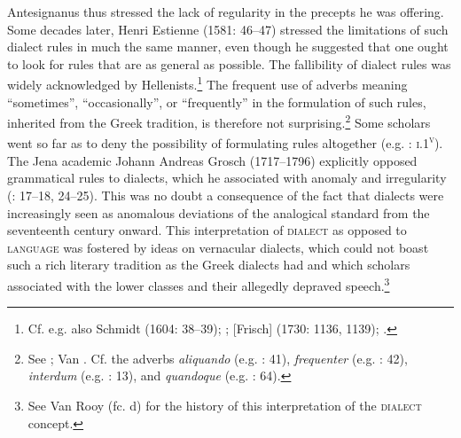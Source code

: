 Antesignanus thus stressed the lack of regularity in the precepts he was offering. Some decades later, Henri Estienne (1581: 46–47) stressed the limitations of such dialect rules in much the same manner, even though he suggested that one ought to look for rules that are as general as possible. The fallibility of dialect rules was widely acknowledged by Hellenists.\footnote{ \textrm{Cf. e.g. also Schmidt (1604: 38–39); \citet[2]{Heupel1712}; [Frisch] (1730: 1136, 1139); \citet[299]{Jehne1782}.}} The frequent use of adverbs meaning “sometimes”, “occasionally”, or “frequently” in the formulation of such rules, inherited from the Greek tradition, is therefore not surprising.\footnote{ \textrm{See \citet[53]{Förstel1999}; Van \citet[516]{Rooy2014}. Cf. the adverbs} \textrm{\textit{aliquando}} \textrm{(e.g. \citealt{Walper1589}: 41),} \textrm{\textit{frequenter}} \textrm{(e.g. \citealt{Walper1589}: 42),} \textrm{\textit{interdum}} \textrm{(e.g. \citealt{Antesignanus1554}: 13),}\textrm{ }\textrm{and} \textrm{\textit{quandoque}} \textrm{(e.g. \citealt{Walper1589}: 64).}} Some scholars went so far as to deny the possibility of formulating rules altogether (e.g. \citealt{Camden1595}: \textsc{i}.1\textsc{\textsuperscript{v}}). The Jena academic Johann Andreas Grosch (1717–1796) explicitly opposed grammatical rules to dialects, which he associated with anomaly and irregularity (\citealt{Grosch1753}: 17–18, 24–25). This was no doubt a consequence of the fact that dialects were increasingly seen as anomalous deviations of the analogical standard from the seventeenth century onward. This interpretation of \textsc{dialect} as opposed to \textsc{language} was fostered by ideas on vernacular dialects, which could not boast such a rich literary tradition as the Greek dialects had and which scholars associated with the lower classes and their allegedly depraved speech.\footnote{ \textrm{See Van Rooy (fc. d) for the history of this interpretation of the} \textrm{\textsc{dialect}} \textrm{concept.}}

